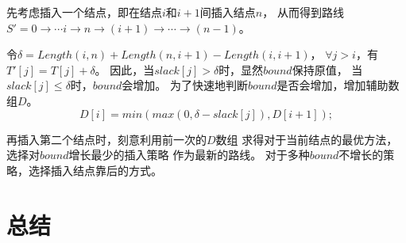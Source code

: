 \documentclass[hyperref,UTF8]{ctexart}
\theoremstyle{definition}
\theoremstyle{remark}
\numberwithin{equation}{subsection}
\begin{document}
先考虑插入一个结点，即在结点$i$和$i+1$间插入结点$n$，
从而得到路线$S' = 0 \rightarrow \cdots i \rightarrow n \rightarrow (i+1) \rightarrow \cdots \rightarrow (n-1)$。

令$\delta = Length(i,n) + Length(n,i+1) - Length(i,i+1)$，
$\forall j>i$，有$T'[j] = T[j] + \delta$。
因此，当$slack[j] > \delta$时，显然$bound$保持原值，
当$slack[j] \le \delta$时，$bound$会增加。
为了快速地判断$bound$是否会增加，增加辅助数组$D$。
\[
	D[i] = min(max(0,\delta-slack[j]), D[i+1]);
\]

再插入第二个结点时，刻意利用前一次的$D$数组
求得对于当前结点的最优方法，选择对$bound$增长最少的插入策略
作为最新的路线。
对于多种$bound$不增长的策略，选择插入结点靠后的方式。

\section{总结}
	
	
\end{document}
